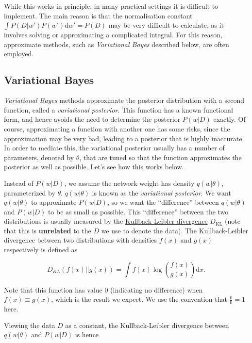 \documentclass[11pt]{article}
\begin{document}
While this works in principle, in many practical settings it is
difficult to implement. The main reason is that the normalisation
constant \({\int P(D | w') P(w') \text{d}w'} = P(D)\) may be very
difficult to calculate, as it involves solving or approximating a
complicated integral. For this reason, approximate methods, such as
\emph{Variational Bayes} described below, are often employed.

    \hypertarget{variational-bayes}{%
\subsection{Variational Bayes}\label{variational-bayes}}

\emph{Variational Bayes} methods approximate the posterior distribution
with a second function, called a \emph{variational posterior}. This
function has a known functional form, and hence avoids the need to
determine the posterior \(P(w | D)\) exactly. Of course, approximating a
function with another one has some risks, since the approximation may be
very bad, leading to a posterior that is highly inaccurate. In order to
mediate this, the variational posterior usually has a number of
parameters, denoted by \(\theta\), that are tuned so that the function
approximates the posterior as well as possible. Let's see how this works
below.

Instead of \(P(w | D)\), we assume the network weight has density
\(q(w | \theta)\), parameterized by \(\theta\). \(q(w | \theta)\) is
known as the \emph{variational posterior}. We want \(q(w | \theta)\) to
approximate \(P(w | D)\), so we want the ``difference'' between
\(q(w | \theta)\) and \(P(w | D)\) to be as small as possible. This
``difference'' between the two distributions is usually measured by the
\href{https://en.wikipedia.org/wiki/Kullback\%E2\%80\%93Leibler_divergence}{Kullback-Leibler
divergence} \(D_{\text{KL}}\) (note that this is \textbf{unrelated} to
the \(D\) we use to denote the data). The Kullback-Leibler divergence
between two distributions with densities \(f(x)\) and \(g(x)\)
respectively is defined as

\[
D_{KL} (f(x) || g(x)) = \int f(x) \log \left( \frac{f(x)}{g(x)} \right) \text{d} x.
\]

Note that this function has value 0 (indicating no difference) when
\(f(x) \equiv g(x)\), which is the result we expect. We use the
convention that \(\frac{0}{0} = 1\) here.

Viewing the data \(D\) as a constant, the Kullback-Leibler divergence
between \(q(w | \theta)\) and \(P(w | D)\) is hence
\end{document}
